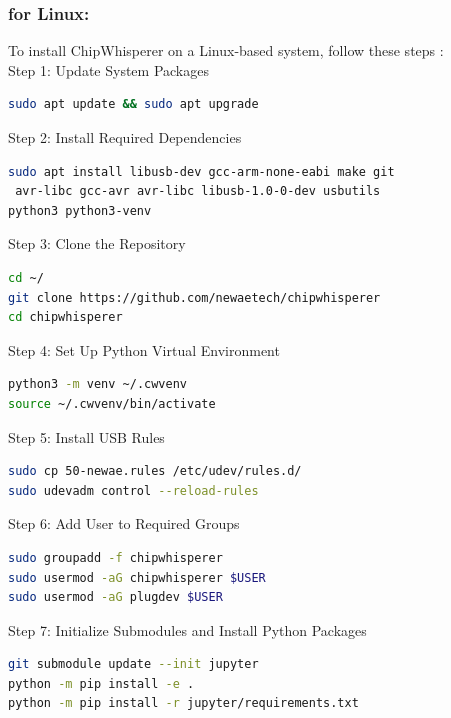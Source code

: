 \subsubsection{for Linux:}

To install ChipWhisperer on a Linux-based system, follow these steps \cite{chipwhisperer_linux_install}:\\

Step 1: Update System Packages\\
\begin{lstlisting}[language=bash]
sudo apt update && sudo apt upgrade
\end{lstlisting}

Step 2: Install Required Dependencies\\
\begin{lstlisting}[language=bash]
sudo apt install libusb-dev gcc-arm-none-eabi make git
 avr-libc gcc-avr avr-libc libusb-1.0-0-dev usbutils
python3 python3-venv
\end{lstlisting}

Step 3: Clone the Repository\\
\begin{lstlisting}[language=bash]
cd ~/
git clone https://github.com/newaetech/chipwhisperer
cd chipwhisperer
\end{lstlisting}

Step 4: Set Up Python Virtual Environment\\
\begin{lstlisting}[language=bash]
python3 -m venv ~/.cwvenv
source ~/.cwvenv/bin/activate
\end{lstlisting}

Step 5: Install USB Rules\\
\begin{lstlisting}[language=bash]
sudo cp 50-newae.rules /etc/udev/rules.d/
sudo udevadm control --reload-rules
\end{lstlisting}

Step 6: Add User to Required Groups\\
\begin{lstlisting}[language=bash]
sudo groupadd -f chipwhisperer
sudo usermod -aG chipwhisperer $USER
sudo usermod -aG plugdev $USER
\end{lstlisting}

Step 7: Initialize Submodules and Install Python Packages\\
\begin{lstlisting}[language=bash]
git submodule update --init jupyter
python -m pip install -e .
python -m pip install -r jupyter/requirements.txt
\end{lstlisting}

